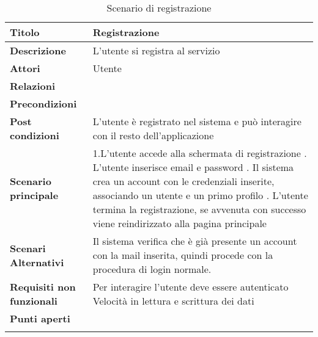 \begin{longtable} {|P{4.5cm}|P{11cm}|}
        \hline
        \textbf{Titolo}                   & Registrazione                                                                         \\
        \hline
        \textbf{Descrizione}              & L'utente si registra al servizio                                                      \\
        \hline
        \textbf{Attori}                   & Utente                                                                                \\
        \hline
        \textbf{Relazioni}                &                                                                                       \\
        \hline
        \textbf{Precondizioni}            &                                                                                       \\
        \hline
        \textbf{Post condizioni}           & L'utente è registrato nel sistema e può interagire con il resto dell'applicazione     \\
        \hline
        \textbf{Scenario principale}      & 1.L'utente accede alla schermata di registrazione      . L'utente inserisce email e  password                      . Il sistema crea un account con le credenziali inserite, associando un utente e un primo profilo   . L'utente termina la registrazione, se avvenuta con successo viene reindirizzato alla pagina principale
        \\
        \hline
        \textbf{Scenari Alternativi}      &

        Il sistema verifica che è già presente un account con la mail inserita, quindi procede con la procedura di login normale. \\
        \hline
        \textbf{Requisiti non funzionali} &
        Per interagire l'utente deve essere autenticato \newline
        Velocità in lettura e scrittura dei dati                                                                                  \\
        \hline
        \textbf{Punti aperti}             &                                                                                       \\
        \hline
    \caption{Scenario di registrazione}
\end{longtable}

